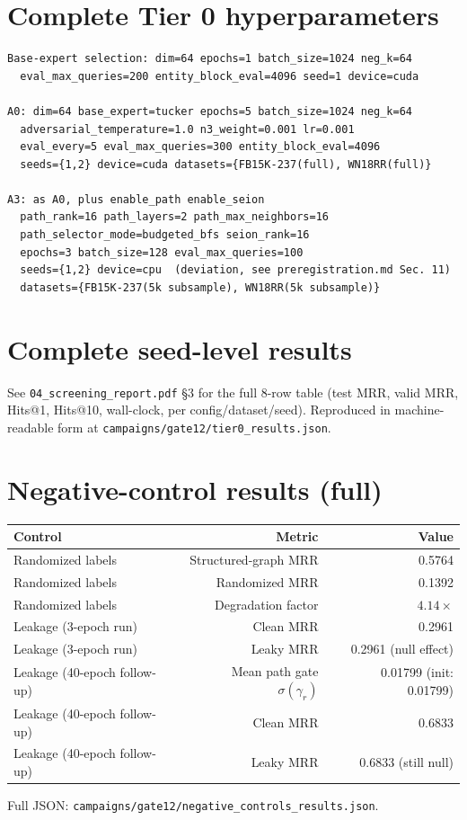 \documentclass[11pt]{article}
\begin{document}

\tableofcontents

\section{Complete Tier 0 hyperparameters}
\begin{lstlisting}[basicstyle=\ttfamily\small]
Base-expert selection: dim=64 epochs=1 batch_size=1024 neg_k=64
  eval_max_queries=200 entity_block_eval=4096 seed=1 device=cuda

A0: dim=64 base_expert=tucker epochs=5 batch_size=1024 neg_k=64
  adversarial_temperature=1.0 n3_weight=0.001 lr=0.001
  eval_every=5 eval_max_queries=300 entity_block_eval=4096
  seeds={1,2} device=cuda datasets={FB15K-237(full), WN18RR(full)}

A3: as A0, plus enable_path enable_seion
  path_rank=16 path_layers=2 path_max_neighbors=16
  path_selector_mode=budgeted_bfs seion_rank=16
  epochs=3 batch_size=128 eval_max_queries=100
  seeds={1,2} device=cpu  (deviation, see preregistration.md Sec. 11)
  datasets={FB15K-237(5k subsample), WN18RR(5k subsample)}
\end{lstlisting}

\section{Complete seed-level results}
See \texttt{04\_screening\_report.pdf} \S3 for the full 8-row table (test MRR, valid MRR, Hits@1,
Hits@10, wall-clock, per config/dataset/seed). Reproduced in machine-readable form at
\texttt{campaigns/gate12/tier0\_results.json}.

\section{Negative-control results (full)}
\begin{center}
\begin{tabular}{lrr}
\toprule
Control & Metric & Value \\
\midrule
Randomized labels & Structured-graph MRR & 0.5764 \\
Randomized labels & Randomized MRR & 0.1392 \\
Randomized labels & Degradation factor & $4.14\times$ \\
Leakage (3-epoch run) & Clean MRR & 0.2961 \\
Leakage (3-epoch run) & Leaky MRR & 0.2961 (null effect) \\
Leakage (40-epoch follow-up) & Mean path gate $\sigma(\gamma_r)$ & 0.01799 (init: 0.01799) \\
Leakage (40-epoch follow-up) & Clean MRR & 0.6833 \\
Leakage (40-epoch follow-up) & Leaky MRR & 0.6833 (still null) \\
\bottomrule
\end{tabular}
\end{center}
Full JSON: \texttt{campaigns/gate12/negative\_controls\_results.json}.
\end{document}
